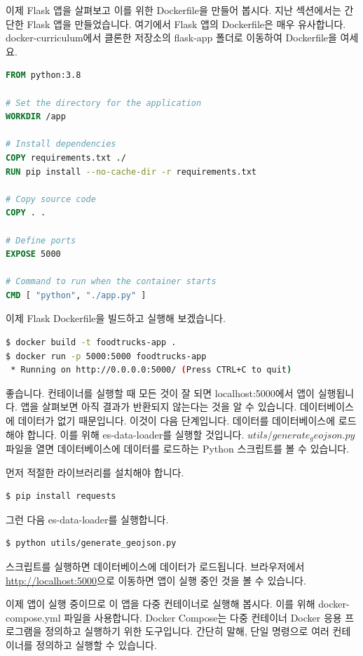 이제 Flask 앱을 살펴보고 이를 위한 Dockerfile을 만들어 봅시다. 지난 섹션에서는 간단한 Flask 앱을 만들었습니다. 여기에서 Flask 앱의 Dockerfile은 매우 유사합니다. docker-curriculum에서 클론한 저장소의 flask-app 폴더로 이동하여 Dockerfile을 여세요.
\begin{lstlisting}[language=dockerfile]
FROM python:3.8

# Set the directory for the application
WORKDIR /app

# Install dependencies
COPY requirements.txt ./
RUN pip install --no-cache-dir -r requirements.txt

# Copy source code
COPY . .

# Define ports
EXPOSE 5000

# Command to run when the container starts
CMD [ "python", "./app.py" ]
\end{lstlisting}

이제 Flask Dockerfile을 빌드하고 실행해 보겠습니다.
\begin{lstlisting}[language=bash]
$ docker build -t foodtrucks-app .
$ docker run -p 5000:5000 foodtrucks-app
 * Running on http://0.0.0.0:5000/ (Press CTRL+C to quit)
\end{lstlisting}

좋습니다. 컨테이너를 실행할 때 모든 것이 잘 되면 localhost:5000에서 앱이 실행됩니다. 앱을 살펴보면 아직 결과가 반환되지 않는다는 것을 알 수 있습니다. 데이터베이스에 데이터가 없기 때문입니다. 이것이 다음 단계입니다. 데이터를 데이터베이스에 로드해야 합니다. 이를 위해 es-data-loader를 실행할 것입니다. $utils/generate_geojson.py$ 파일을 열면 데이터베이스에 데이터를 로드하는 Python 스크립트를 볼 수 있습니다.

먼저 적절한 라이브러리를 설치해야 합니다.
\begin{lstlisting}[language=bash]
$ pip install requests
\end{lstlisting}

그런 다음 es-data-loader를 실행합니다.
\begin{lstlisting}[language=bash]
$ python utils/generate_geojson.py
\end{lstlisting}

스크립트를 실행하면 데이터베이스에 데이터가 로드됩니다. 브라우저에서 \url{http://localhost:5000}으로 이동하면 앱이 실행 중인 것을 볼 수 있습니다.

이제 앱이 실행 중이므로 이 앱을 다중 컨테이너로 실행해 봅시다. 이를 위해 docker-compose.yml 파일을 사용합니다. Docker Compose는 다중 컨테이너 Docker 응용 프로그램을 정의하고 실행하기 위한 도구입니다. 간단히 말해, 단일 명령으로 여러 컨테이너를 정의하고 실행할 수 있습니다.

